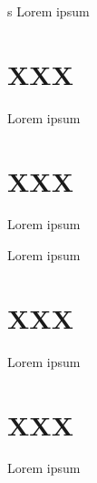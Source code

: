 \documentclass{article}
\begin{document}
s
\newpage
Lorem ipsum

\section{XXX}

Lorem ipsum


\section{XXX}

Lorem ipsum



\newpage
\beginnumbering
\pstart Lorem ipsum
\pend

\section{XXX}\relax
\pstart
Lorem ipsum
\pend
\section{XXX}
\pstart
Lorem ipsum
\pend
\endnumbering
\end{document}
